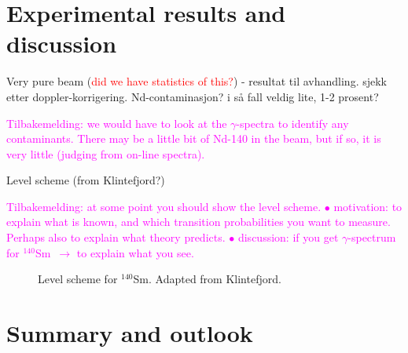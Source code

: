 \documentclass[twoside,english]{uiofysmaster/uiofysmaster}
\newcommand{\Sm}{$^{140}$Sm} %
\newcommand{\ga}{$\gamma$}
\begin{document}


\chapter{Experimental results and discussion}


Very pure beam (\textcolor{red}{did we have statistics of this?}) - resultat til avhandling. sjekk etter doppler-korrigering. Nd-contaminasjon? i så fall veldig lite, 1-2 prosent?

\textcolor{Magenta}{Tilbakemelding: \newline
we would have to look at the \ga-spectra to identify any contaminants. There may be a little bit of Nd-140 in the beam, but if so, it is very little (judging from on-line spectra).}


\bigskip


Level scheme (from Klintefjord?)\newline

\textcolor{Magenta}{Tilbakemelding: \newline
at some point you should show the level scheme. \newline
$\bullet$ motivation: to explain what is known, and which transition probabilities you want to measure.  \newline
Perhaps also to explain what theory predicts. \newline
$\bullet$ discussion: if you get \ga-spectrum for \Sm\ $\rightarrow$ to explain what you see.}


\begin{figure}[ht]
	\centering
	
	\caption{Level scheme for \Sm. Adapted from Klintefjord.}
	\label{fig:levels}
\end{figure}





\chapter{Summary and outlook}
\end{document}
